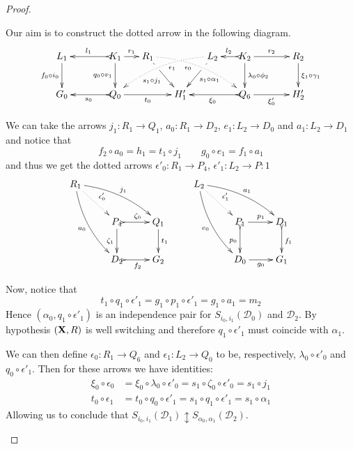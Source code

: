 \documentclass[a4paper,UKenglish,cleveref,pdftex,thm-restate,numberwithinsect,anonymous]{lipics}
\def\R{\mathsf{R}}
\def\X{\textbf {\textup{X}}}
\def\G{\textbf {\textup{G}}}
\newcommand{\dder}[1]{\mathscr{#1}}
\begin{document}
\begin{proof}
\begin{enumerate}
		Our aim is to construct the dotted arrow in the following diagram.
		\[\xymatrix@C=15pt{L_1 \ar[d]_{f_0\circ i_0}&& K_1
			\ar[d]_{q_0\circ v_1}\ar@{>->}[ll]_{l_1} \ar[r]^{r_1} & R_1
			\ar@{.>}@/^.35cm/[drrr]_(.4){\epsilon_0}|(.285)\hole
			\ar[dr]|(.28)\hole_{s_1\circ j_1} && L_2
			\ar@{.>}@/_.35cm/[dlll]^(.4){\epsilon_1}
			\ar[dl]|(.28)\hole^{s_1\circ \alpha_1}& K_2
			\ar[d]^{\lambda_0\circ \phi_2}\ar@{>->}[l]_{l_2} \ar[rr]^{r_2} &&
			R_2 \ar[d]^{\xi_1\circ \gamma_1}\\G_0 && \ar@{>->}[ll]^{s_0} Q_0
			\ar[rr]_{t_0}&& H'_1 && \ar@{>->}[ll]^{\xi_0} Q_6
			\ar[rr]_{\xi'_0}&& H'_2}\]
		
		We can take the arrows $j_1\colon R_1\to Q_1$, 
		$a_0\colon R_1\to D_2$, $e_1\colon L_2 \to D_0$ and $a_1\colon L_2\to D_1$ and notice that
		\[	f_2\circ a_0 =h_1 =t_1\circ j_1 \qquad   g_0\circ e_1=f_1\circ a_1\]
		and thus we get the dotted arrows $\epsilon'_0\colon R_1\to P_4$, $\epsilon'_1\colon L_2\to P:1$ 
		\[\xymatrix{R_1 \ar@{.>}[dr]^{\epsilon'_0} 
			\ar@/^.3cm/[drr]^{j_1} \ar@/_.3cm/[ddr]_{a_0}&&& L_2 \ar@{.>}[dr]^{\epsilon'_1}
			\ar@/^.3cm/[drr]^{a_1} \ar@/_.3cm/[ddr]_{e_0}\\ &P_4
			\ar@{>->}[r]^{\zeta_0} \ar[d]_{\zeta_1}& Q_1 \ar[d]^{t_1} &&P_1
			\ar[r]^{p_1} \ar@{>->}[d]_{p_0}& D_1 \ar@{>->}[d]^{f_1}\\
			&D_2\ar@{>->}[r]_{f_2} & G_2& 	&D_0\ar[r]_{g_0} & G_1} \]
		
		Now, notice that
		\[
		t_1\circ q_1\circ \epsilon'_1  =g_1\circ p_1\circ \epsilon'_1  =g_1\circ a_1 =m_2
		\]
		Hence $(\alpha_0, q_1\circ \epsilon'_1)$ is an independence pair
		for $S_{i_0, i_1}(\dder{D}_0)$ and $\dder{D}_2$. By hypothesis $(\X, \R)$ is well switching and therefore
		$q_1\circ \epsilon'_1$ must coincide with $\alpha_1$.	
		
		
		We can then define $\epsilon_0\colon R_1\to Q_6$ and $\epsilon_1\colon L_2\to Q_0$ to be, respectively, 
		$\lambda_0\circ \epsilon'_0$ and $q_0\circ
		\epsilon'_1$. Then for these  arrows we have  identities:
		\begin{align*}
			\xi_0\circ \epsilon_0 & =\xi_0\circ \lambda_0\circ \epsilon'_0 =s_1\circ \zeta_0 \circ \epsilon'_0=s_1\circ j_1\\	t_0\circ \epsilon_1 & = t_0\circ q_0\circ \epsilon'_1 =s_1\circ q_1\circ \epsilon'_1=s_1\circ \alpha_1
		\end{align*}
		Allowing us to conclude that
		$S_{i_0,i_1}(\dder{D}_1)\updownarrow S_{\alpha_0,
			\alpha_1}(\dder{D}_2)$.  \qedhere
	\end{enumerate}
\end{proof}
\end{document}
